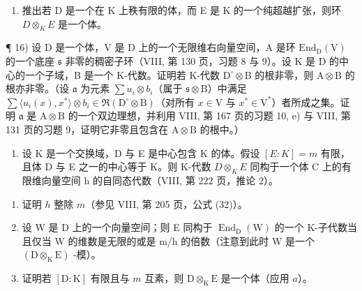 \begin{enumerate}
\def\labelenumi{\alph{enumi})}
\setcounter{enumi}{1}
\tightlist
\item
  推出若 D 是一个在 K 上秩有限的体，而 E 是 K 的一个纯超越扩张，则环 \(D \otimes_{K} E\) 是一个体。
\end{enumerate}

¶ 16) 设 D 是一个体，V 是 D 上的一个无限维右向量空间，A 是环 \(\mathrm{End}_{\mathrm{D}}(\mathrm{V})\) 的一个底座 \(\mathfrak{s}\) 非零的稠密子环（VIII, 第 130 页，习题 8 与 9）。设 K 是 D 的中心的一个子域，B 是一个 K-代数。证明若 K-代数 \(\mathrm{D}^{\circ} \otimes \mathrm{B}\) 的根非零，则 \(\mathrm{A} \otimes \mathrm{B}\) 的根亦非零。（设 \(\mathfrak{a}\) 为元素 \(\sum u_{i} \otimes b_{i}\)（属于 \(\mathfrak{s} \otimes \mathrm{B}\)）中满足 \(\sum \langle u_{i}(x), x^{*} \rangle \otimes b_{i} \in \Re(\mathrm{D}^{\circ} \otimes \mathrm{B})\)（对所有 \(x \in \mathrm{V}\) 与 \(x^{*} \in \mathrm{V}^{*}\)）者所成之集。证明 \(\mathfrak{a}\) 是 \(\mathrm{A} \otimes \mathrm{B}\) 的一个双边理想，并利用 VIII, 第 167 页的习题 10, e) 与 VIII, 第 131 页的习题 9，证明它非零且包含在 \(\mathrm{A} \otimes \mathrm{B}\) 的根中。）

\begin{enumerate}
\def\labelenumi{\arabic{enumi})}
\setcounter{enumi}{16}
\tightlist
\item
  设 K 是一个交换域，D 与 E 是中心包含 K 的体。假设 \([E:K]=m\) 有限，且体 D 与 E 之一的中心等于 K。则 K-代数 \(D\otimes_{K}E\) 同构于一个体 C 上的有限维向量空间 h 的自同态代数（VIII, 第 222 页，推论 2）。
\end{enumerate}

\begin{enumerate}
\def\labelenumi{\alph{enumi})}
\item
  证明 \(h\) 整除 \(m\)（参见 VIII, 第 205 页，公式 (32)）。
\item
  设 W 是 D 上的一个向量空间；则 E 同构于 \(\operatorname{End}_{\mathrm{D}}(\mathrm{W})\) 的一个 K-子代数当且仅当 W 的维数是无限的或是 m/h 的倍数（注意到此时 W 是一个 \((\mathrm{D} \otimes_{\mathrm{K}} \mathrm{E})\) -模）。
\item
  证明若 \([\mathrm{D}:\mathrm{K}]\) 有限且与 \(m\) 互素，则 \(\mathrm{D}\otimes_{\mathrm{K}}\mathrm{E}\) 是一个体（应用 \(a\)）。
\end{enumerate}

